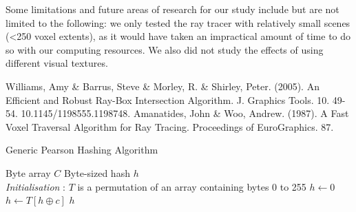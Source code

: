 \documentclass[conference]{IEEEtran}
\begin{document}
Some limitations and future areas of research for our study include but are not limited to the following: we only tested the ray tracer with relatively small scenes (<250 voxel extents), as it would have taken an impractical amount of time to do so with our computing resources. We also did not study the effects of using different visual textures.

\begin{thebibliography}{00}
 Williams, Amy \& Barrus, Steve \& Morley, R. \& Shirley, Peter. (2005). An Efficient and Robust Ray-Box Intersection Algorithm. J. Graphics Tools. 10. 49-54. 10.1145/1198555.1198748. 
 Amanatides, John \& Woo, Andrew. (1987). A Fast Voxel Traversal Algorithm for Ray Tracing. Proceedings of EuroGraphics. 87.
\end{thebibliography}

\begin{algorithm}[H]
\caption{Generic Pearson Hashing Algorithm}
\begin{algorithmic}[1]
\REQUIRE Byte array $C$
\ENSURE Byte-sized hash $h$
\\ \textit{Initialisation} : $T$ is a permutation of an array containing bytes 0 to 255
\STATE $h \gets 0$
\STATE $h \gets T[h \oplus c]$
\ENDFOR
\RETURN $h$
\end{algorithmic}
\label{pearson}
\end{algorithm}
\end{document}
